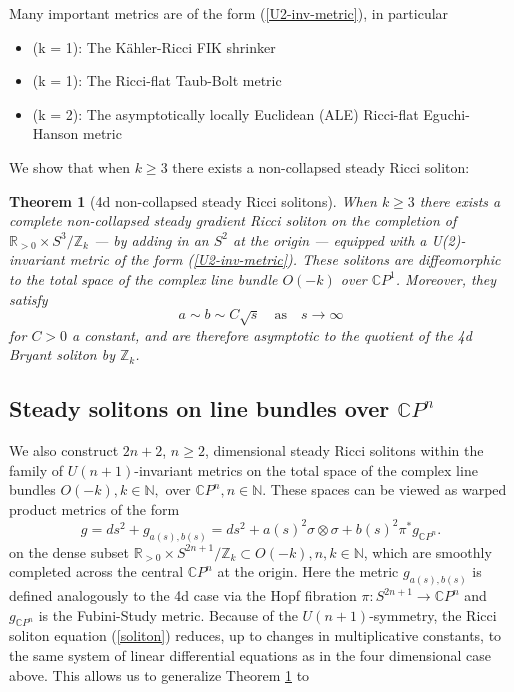\documentclass{amsart}
\newtheorem{thm}{Theorem}[section]
\theoremstyle{definition}
\theoremstyle{remark}
\numberwithin{equation}{section}
\newcommand{\R}{\mathbb{R}}  %
\newcommand{\N}{\mathbb{N}}
\begin{document}
\vspace{1em}\noindent
Many important metrics are of the form (\ref{U2-inv-metric}), in particular
\begin{itemize}
\item (k = 1): The K\"ahler-Ricci FIK shrinker \cite{FIK03}
\item (k = 1): The Ricci-flat Taub-Bolt metric \cite{P78}
\item (k = 2): The asymptotically locally Euclidean (ALE) Ricci-flat Eguchi-Hanson metric \cite{EH79} 
\end{itemize}
We show that when $k \geq 3$ there exists a non-collapsed steady Ricci soliton:


\begin{thm}[4d non-collapsed steady Ricci solitons]
\label{cor:4d-non-collapsed-solitons}
When $k \geq 3$ there exists a complete non-collapsed steady gradient Ricci soliton on the completion of $\R_{>0} \times S^3/\mathbb{Z}_k$ --- by adding in an $S^2$ at the origin --- equipped with a U(2)-invariant metric of the form (\ref{U2-inv-metric}). These solitons are diffeomorphic to the total space of the complex line bundle $O(-k)$ over $\mathbb{C}P^1$. Moreover, they satisfy
$$a \sim b \sim C \sqrt{s} \quad \text{as} \quad s\rightarrow \infty$$ 
for $C>0$ a constant, and are therefore asymptotic to the quotient of the 4d Bryant soliton \cite{B05} by $\mathbb{Z}_k$.
\end{thm}


\subsection{Steady solitons on line bundles over $\mathbb{C}P^n$}
We also construct $2n+2$, $n \geq 2$, dimensional steady Ricci solitons within the family of $U(n+1)$-invariant metrics on the total space of the complex 
line bundles $O(-k), k\in\N,$ over $\mathbb{C}P^n, n \in \N$. These spaces can be viewed as warped product
metrics of the form
\begin{equation}
\label{warped_hd}
g = ds^2 + g_{a(s),b(s)} = ds^2 + a(s)^2 \sigma \otimes \sigma + b(s)^2 \pi^{\ast}g_{\mathbb{C}P^n}.
\end{equation}
on the dense subset $\R_{>0} \times S^{2n+1}/\mathbb{Z}_k \subset O(-k), n, k \in \N$, which are smoothly completed across the central $\mathbb{C}P^n$ at the origin. Here the metric $g_{a(s),b(s)}$ is defined analogously to the 4d case via the Hopf fibration $\pi: S^{2n+1} \rightarrow \mathbb{C}P^n$ and $g_{\mathbb{C}P^n}$ is the Fubini-Study metric. Because of the $U(n+1)$-symmetry, the Ricci soliton equation (\ref{soliton})
reduces, up to changes in multiplicative constants, to the same system of linear differential equations as in the four dimensional case above.
This allows us to generalize Theorem \ref{cor:4d-non-collapsed-solitons} to 
\end{document}
